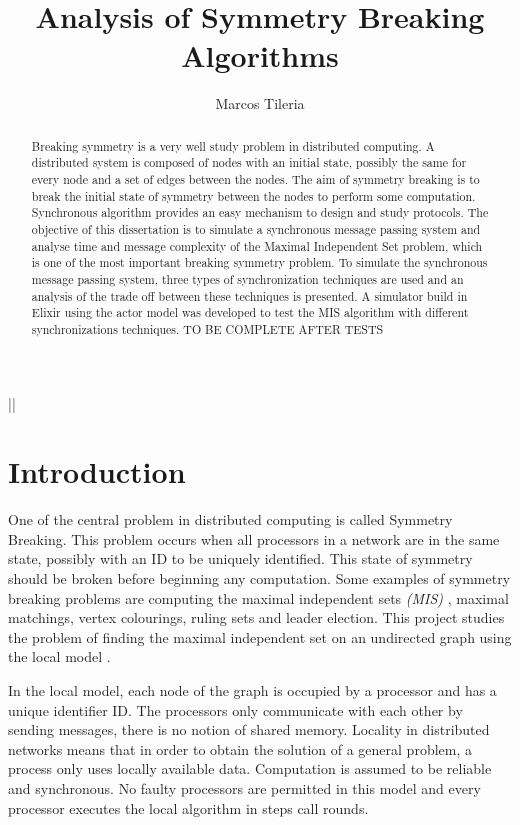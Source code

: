 ||\documentclass[11pt]{article} %
\title{Analysis of Symmetry Breaking Algorithms}
\author{Marcos Tileria}
\theoremstyle{plain}
\theoremstyle{definition}
\begin{document}
\maketitle

\declaration

\begin{abstract}
  
Breaking symmetry is a very well study problem in distributed computing. A distributed system is composed of nodes with an initial state, possibly the same for every node and a set of edges between the nodes. The aim of symmetry breaking is to break the initial state of symmetry between the nodes to perform some computation. Synchronous algorithm provides an easy mechanism to design and study protocols. The objective of this dissertation is to simulate a synchronous message passing system and analyse time and message complexity of the Maximal Independent Set problem, which is one of the most important breaking symmetry problem. To simulate the synchronous message passing system, three types of synchronization techniques are used and an analysis of the trade off between these techniques is presented. A simulator build in Elixir using the actor model was developed to test the MIS algorithm with different synchronizations techniques. TO BE COMPLETE AFTER TESTS 
  
\end{abstract}

\section{Introduction}

 One of the central problem in distributed computing is called Symmetry Breaking. This problem occurs when all processors in a network are in the same state, possibly with an ID to be uniquely identified. This state of symmetry should be broken before beginning any computation. Some examples of symmetry breaking problems are computing the maximal independent sets \textit{(MIS)} , maximal matchings, vertex colourings, ruling sets and leader election. This project studies the problem of finding the maximal independent set on an undirected graph using the local model \cite{linial1992locality}.

In the local model, each node of the graph is occupied by a processor and has a unique identifier ID. The processors only communicate with each other by sending messages, there is no notion of shared memory. Locality in distributed networks means that in order to obtain the solution of a general problem, a process only uses locally available data. Computation is assumed to be reliable and synchronous. No faulty processors are permitted in this model and every processor executes the local algorithm in steps call rounds.
\end{document}
